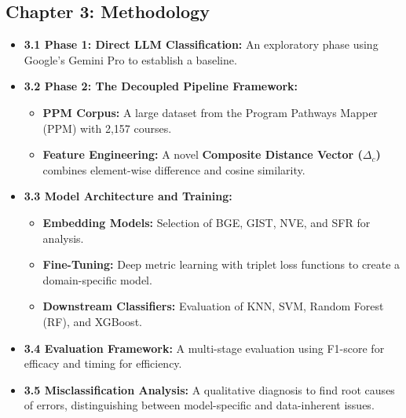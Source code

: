 \documentclass[11pt]{article}
\begin{document}
\subsection*{Chapter 3: Methodology}
\begin{itemize}
    \item \textbf{3.1 Phase 1: Direct LLM Classification:} An exploratory phase using Google's Gemini Pro to establish a baseline.
    \item \textbf{3.2 Phase 2: The Decoupled Pipeline Framework:}
    \begin{itemize}
        \item \textbf{PPM Corpus:} A large dataset from the Program Pathways Mapper (PPM) with 2,157 courses.
        \item \textbf{Feature Engineering:} A novel \textbf{Composite Distance Vector ($\Delta_{c}$)} combines element-wise difference and cosine similarity.
    \end{itemize}
    \item \textbf{3.3 Model Architecture and Training:}
    \begin{itemize}
        \item \textbf{Embedding Models:} Selection of BGE, GIST, NVE, and SFR for analysis.
        \item \textbf{Fine-Tuning:} Deep metric learning with triplet loss functions to create a domain-specific model.
        \item \textbf{Downstream Classifiers:} Evaluation of KNN, SVM, Random Forest (RF), and XGBoost.
    \end{itemize}
    \item \textbf{3.4 Evaluation Framework:} A multi-stage evaluation using F1-score for efficacy and timing for efficiency.
    \item \textbf{3.5 Misclassification Analysis:} A qualitative diagnosis to find root causes of errors, distinguishing between model-specific and data-inherent issues.
\end{itemize}
\end{document}
